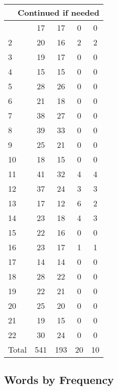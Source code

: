 \begin{center}
\begin{longtable}{l|c|c|c|c}
\hline \multicolumn{5}{|r|}{{Continued if needed}} \\ \hline
\endfoot 
1 & 17 & 17 & 0 & 0\\ \hline
2 & 20 & 16 & 2 & 2\\ \hline
3 & 19 & 17 & 0 & 0\\ \hline
4 & 15 & 15 & 0 & 0\\ \hline
5 & 28 & 26 & 0 & 0\\ \hline
6 & 21 & 18 & 0 & 0\\ \hline
7 & 38 & 27 & 0 & 0\\ \hline
8 & 39 & 33 & 0 & 0\\ \hline
9 & 25 & 21 & 0 & 0\\ \hline
10 & 18 & 15 & 0 & 0\\ \hline
11 & 41 & 32 & 4 & 4\\ \hline
12 & 37 & 24 & 3 & 3\\ \hline
13 & 17 & 12 & 6 & 2\\ \hline
14 & 23 & 18 & 4 & 3\\ \hline
15 & 22 & 16 & 0 & 0\\ \hline
16 & 23 & 17 & 1 & 1\\ \hline
17 & 14 & 14 & 0 & 0\\ \hline
18 & 28 & 22 & 0 & 0\\ \hline
19 & 22 & 21 & 0 & 0\\ \hline
20 & 25 & 20 & 0 & 0\\ \hline
21 & 19 & 15 & 0 & 0\\ \hline
22 & 30 & 24 & 0 & 0\\ \hline
\hline \hline
Total & 541 & 193 & 20 & 10



\end{longtable}
\end{center}

 
\subsection{Words by Frequency}

